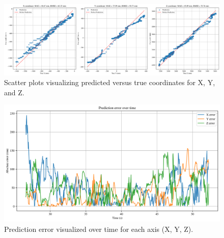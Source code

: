 \documentclass{article}
\begin{document}
	\begin{figure}[H]
		\centering
		\includegraphics[width=6.5in]{figures/Figure5_Scatter_Plots.png}
		\caption{Scatter plots visualizing predicted versus true coordinates for X, Y, and Z.}
		\label{fig:Figure5_Scatter_Plots}
	\end{figure}
	
	\begin{figure}[H]
		\centering
		\includegraphics[width=6.5in]{figures/Figure6_Error_Over_Time.png}
		\caption{Prediction error visualized over time for each axis (X, Y, Z).}
		\label{fig:Figure6_Error_Over_Time}
	\end{figure}
	
\end{document}
